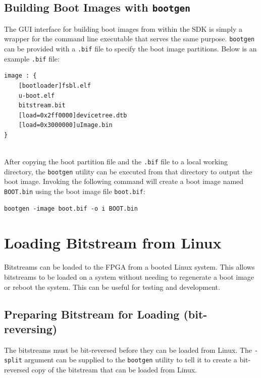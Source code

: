 \newpage

\subsection{Building Boot Images with \texttt{bootgen}}

The GUI interface for building boot images from within the SDK is simply a wrapper for the command line executable that serves the same purpose. \texttt{bootgen} can be provided with a \texttt{.bif} file to specify the boot image partitions. Below is an example \texttt{.bif} file: \\

\begin{lstlisting}[style=text]
image : {
    [bootloader]fsbl.elf
    u-boot.elf
    bitstream.bit
    [load=0x2ff0000]devicetree.dtb
    [load=0x3000000]uImage.bin
}
\end{lstlisting}

~\\
\noindent
After copying the boot partition file and the \texttt{.bif} file to a local working directory, the \texttt{bootgen} utility can be executed from that directory to output the boot image. Invoking the following command will create a boot image named \texttt{BOOT.bin} using the boot image file \texttt{boot.bif}: \\

\begin{lstlisting}[style=text]
bootgen -image boot.bif -o i BOOT.bin
\end{lstlisting}



\section{Loading Bitstream from Linux}
Bitstreams can be loaded to the FPGA from a booted Linux system. This allows bitstreams to be loaded on a system without needing to regenerate a boot image or reboot the system. This can be useful for testing and development.

\subsection{Preparing Bitstream for Loading (bit-reversing)}
The bitstreams must be bit-reversed before  they can be loaded from Linux. The \texttt{-split} argument can be supplied to the \texttt{bootgen} utility to tell it to create a bit-reversed copy of the bitstream that can be loaded from Linux. \\


